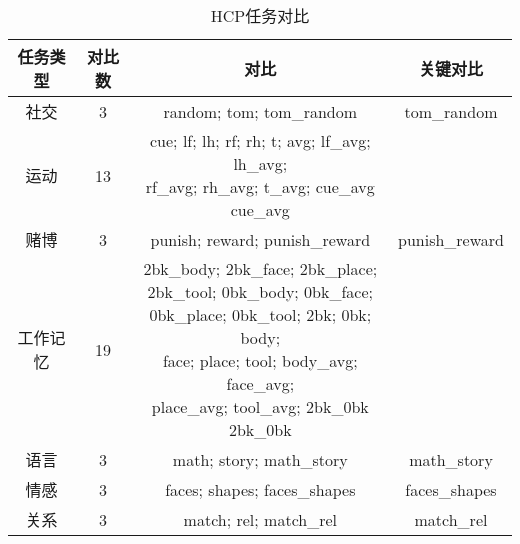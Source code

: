 \documentclass[lang=cn,a4paper,newtx,citestyle=gb7714-2015, bibstyle=gb7714-2015]{elegantpaper}
\begin{document}
\begin{table}[htbp]
	\centering
	\small
	\caption{HCP任务对比}
	\begin{tabular}{cccc}
		\toprule
		任务类型         &       对比数  & 对比  & 关键对比     \\
		\midrule
		社交      &   3      &  random; tom; tom\_random  & tom\_random  \\
		运动      &   13      & \makecell{ cue; lf; lh; rf; rh; t; avg; lf\_avg; lh\_avg; \\rf\_avg; rh\_avg; t\_avg; cue\_avg cue\_avg}  &   \\
		赌博       &   3      &  punish; reward; punish\_reward  & punish\_reward  \\
		工作记忆      &   19      & \makecell{ 2bk\_body; 2bk\_face; 2bk\_place; \\ 2bk\_tool; 0bk\_body; 0bk\_face; \\ 0bk\_place; 0bk\_tool; 2bk; 0bk; body; \\ face; place; tool; body\_avg; face\_avg; \\ place\_avg; tool\_avg; 2bk\_0bk 2bk\_0bk } &   \\
		语言      &   3      &  math; story; math\_story  & math\_story  \\
		情感      &   3      &  faces; shapes; faces\_shapes  & faces\_shapes  \\
		关系      &   3      &  match; rel; match\_rel  & match\_rel  \\
		
		\bottomrule
	\end{tabular}%
	\label{tab:task_contrasts}%
\end{table}%
\end{document}
